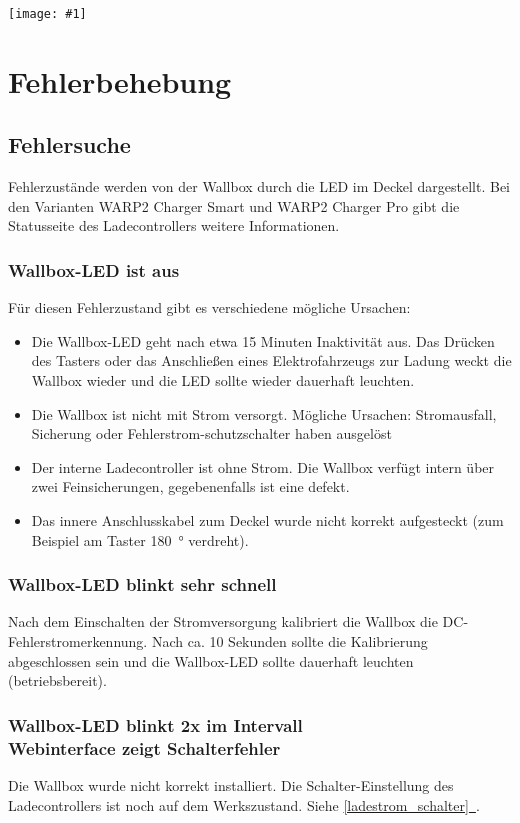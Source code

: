 \documentclass[a4paper,10pt]{article}
\newcommand{\gfx}[1]{\texttt{[image: \#1]}}
\newcommand*{\fullref}[1]{\hyperref[{#1}]{\ref*{#1}~\nameref*{#1}}}
\begin{document}
\begin{multicols*}{2}
	\gfx{./img_warp2/resized/web_charge_manager}

	\newpage \section{Fehlerbehebung}\label{fehlerbehebung} \subsection{Fehlersuche}
	Fehlerzustände werden von der Wallbox durch die LED im Deckel
	dargestellt. Bei den Varianten WARP2 Charger Smart und WARP2 Charger Pro gibt die Statusseite des Ladecontrollers
	weitere Informationen.

	\subsubsection*{Wallbox-LED ist aus}
	Für diesen Fehlerzustand gibt es verschiedene mögliche Ursachen:
	\begin{itemize}
		\item Die Wallbox-LED geht nach etwa 15 Minuten Inaktivität aus. Das Drücken des Tasters
		      oder das Anschließen eines Elektrofahrzeugs zur Ladung weckt die Wallbox wieder
		      und die LED sollte wieder dauerhaft leuchten.
		\item Die Wallbox ist nicht mit Strom versorgt. Mögliche Ursachen: Stromausfall,
		      Sicherung oder Fehlerstrom-schutzschalter haben ausgelöst
		\item Der interne Ladecontroller ist ohne Strom. Die Wallbox verfügt intern über zwei
		      Feinsicherungen, gegebenenfalls ist eine defekt.
		\item Das innere Anschlusskabel zum Deckel wurde nicht korrekt aufgesteckt (zum Beispiel am Taster \SI{180}{\degree} verdreht).
	\end{itemize}

	\subsubsection*{Wallbox-LED blinkt sehr schnell}
	Nach dem Einschalten der Stromversorgung kalibriert die Wallbox die
	DC-Fehlerstromerkennung. Nach ca. 10 Sekunden sollte die Kalibrierung
	abgeschlossen sein und die Wallbox-LED sollte dauerhaft leuchten
	(betriebsbereit).

	\subsubsection*{Wallbox-LED blinkt 2x im Intervall \\ Webinterface zeigt Schalterfehler}
	Die Wallbox wurde nicht korrekt installiert. Die Schalter-Einstellung des Ladecontrollers ist
	noch auf dem Werkszustand. Siehe \fullref{ladestrom_schalter}.


\end{multicols*}
\end{document}
